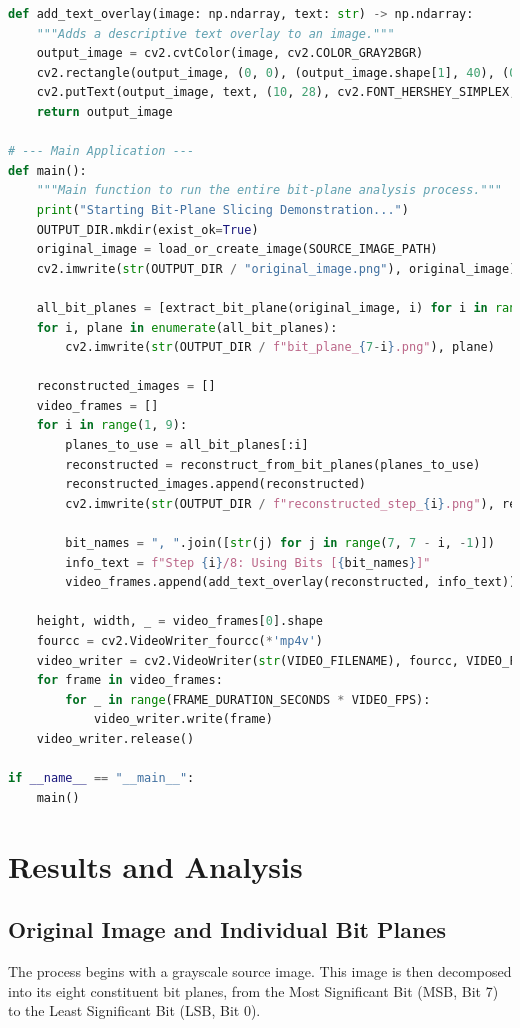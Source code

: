 \documentclass{article}
\begin{document}
\begin{lstlisting}[language=Python, caption={Rewritten Python script for bit-plane slicing and reconstruction.}, label={lst:code}]
def add_text_overlay(image: np.ndarray, text: str) -> np.ndarray:
    """Adds a descriptive text overlay to an image."""
    output_image = cv2.cvtColor(image, cv2.COLOR_GRAY2BGR)
    cv2.rectangle(output_image, (0, 0), (output_image.shape[1], 40), (0, 0, 0), -1)
    cv2.putText(output_image, text, (10, 28), cv2.FONT_HERSHEY_SIMPLEX, 0.8, (0, 255, 0), 2)
    return output_image

# --- Main Application ---
def main():
    """Main function to run the entire bit-plane analysis process."""
    print("Starting Bit-Plane Slicing Demonstration...")
    OUTPUT_DIR.mkdir(exist_ok=True)
    original_image = load_or_create_image(SOURCE_IMAGE_PATH)
    cv2.imwrite(str(OUTPUT_DIR / "original_image.png"), original_image)

    all_bit_planes = [extract_bit_plane(original_image, i) for i in range(7, -1, -1)]
    for i, plane in enumerate(all_bit_planes):
        cv2.imwrite(str(OUTPUT_DIR / f"bit_plane_{7-i}.png"), plane)

    reconstructed_images = []
    video_frames = []
    for i in range(1, 9):
        planes_to_use = all_bit_planes[:i]
        reconstructed = reconstruct_from_bit_planes(planes_to_use)
        reconstructed_images.append(reconstructed)
        cv2.imwrite(str(OUTPUT_DIR / f"reconstructed_step_{i}.png"), reconstructed)
        
        bit_names = ", ".join([str(j) for j in range(7, 7 - i, -1)])
        info_text = f"Step {i}/8: Using Bits [{bit_names}]"
        video_frames.append(add_text_overlay(reconstructed, info_text))
        
    height, width, _ = video_frames[0].shape
    fourcc = cv2.VideoWriter_fourcc(*'mp4v')
    video_writer = cv2.VideoWriter(str(VIDEO_FILENAME), fourcc, VIDEO_FPS, (width, height))
    for frame in video_frames:
        for _ in range(FRAME_DURATION_SECONDS * VIDEO_FPS):
            video_writer.write(frame)
    video_writer.release()

if __name__ == "__main__":
    main()
\end{lstlisting}

\section{Results and Analysis}

\subsection{Original Image and Individual Bit Planes}
The process begins with a grayscale source image. This image is then decomposed into its eight constituent bit planes, from the Most Significant Bit (MSB, Bit 7) to the Least Significant Bit (LSB, Bit 0).
\end{document}
